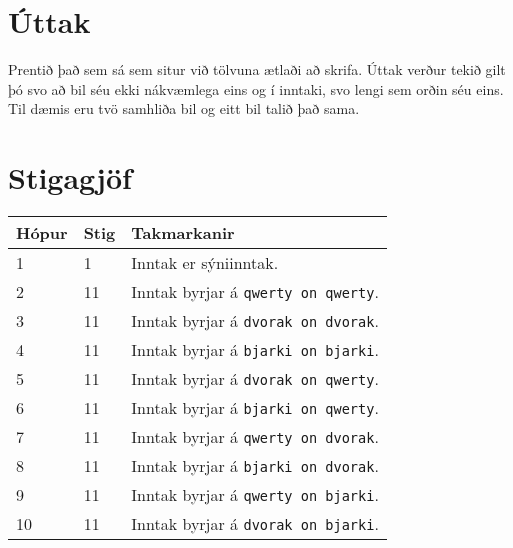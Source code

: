 \section*{Úttak}
Prentið það sem sá sem situr við tölvuna ætlaði að skrifa. Úttak verður tekið gilt þó svo að bil séu ekki nákvæmlega eins og
í inntaki, svo lengi sem orðin séu eins.
Til dæmis eru tvö samhliða bil og eitt bil talið það sama.

\section*{Stigagjöf}
\begin{tabular}{|l|l|l|}
\hline
Hópur & Stig & Takmarkanir \\ \hline
1     & 1    & Inntak er sýniinntak. \\ \hline
2     & 11   & Inntak byrjar á \texttt{qwerty on qwerty}. \\ \hline
3     & 11   & Inntak byrjar á \texttt{dvorak on dvorak}. \\ \hline
4     & 11   & Inntak byrjar á \texttt{bjarki on bjarki}. \\ \hline
5     & 11   & Inntak byrjar á \texttt{dvorak on qwerty}. \\ \hline
6     & 11   & Inntak byrjar á \texttt{bjarki on qwerty}. \\ \hline
7     & 11   & Inntak byrjar á \texttt{qwerty on dvorak}. \\ \hline
8     & 11   & Inntak byrjar á \texttt{bjarki on dvorak}. \\ \hline
9     & 11   & Inntak byrjar á \texttt{qwerty on bjarki}. \\ \hline
10    & 11   & Inntak byrjar á \texttt{dvorak on bjarki}. \\ \hline
\end{tabular}
